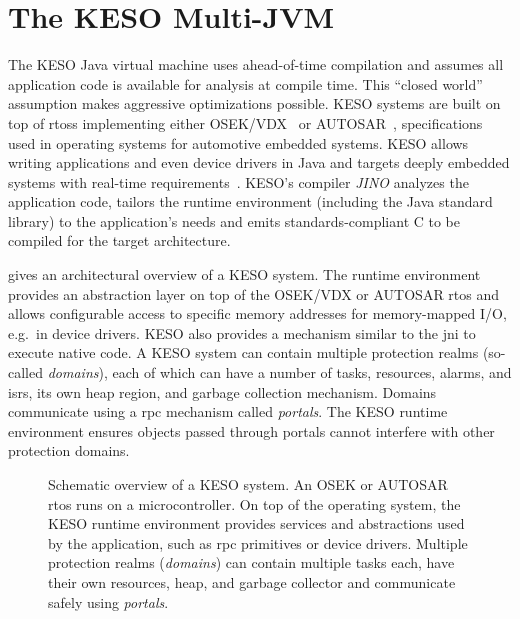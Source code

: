 	\section{The KESO Multi-JVM}
		\label{sec:intro:keso}
		The KESO Java virtual machine uses ahead-of-time compilation and assumes all application code is available for
		analysis at compile time. This \enquote{closed world} assumption makes aggressive optimizations possible. KESO
		systems are built on top of \glspl{rtos} implementing either OSEK/VDX~\cite{OSEKSpec223} or
		AUTOSAR~\cite{autosar:06:sws_os}, specifications used in operating systems for automotive embedded systems. KESO
		allows writing applications and even device drivers in Java and targets deeply embedded systems with real-time
		requirements~\cite{thomm:10:jtres}. KESO's compiler \emph{JINO} analyzes the application code, tailors the runtime
		environment (including the Java standard library) to the application's needs and emits standards-compliant C to be
		compiled for the target architecture.

		 gives an architectural overview of a KESO system. The runtime environment provides an
		abstraction layer on top of the OSEK/VDX or AUTOSAR \gls{rtos} and allows configurable access to specific memory
		addresses for memory-mapped I/O, e.g.\ in device drivers. KESO also provides a mechanism similar to the \gls{jni} to
		execute native code. A KESO system can contain multiple protection realms (so-called \emph{domains}), each of which
		can have a number of tasks, resources, alarms, and \glspl{isr}, its own heap region, and garbage collection
		mechanism. Domains communicate using a \gls{rpc} mechanism called \emph{portals}. The KESO runtime environment
		ensures objects passed through portals cannot interfere with other protection domains.

		\begin{figure}
			\begin{center}
				
			\end{center}
			\caption[Schematic overview of a KESO system]{%
				Schematic overview of a KESO system. An OSEK or AUTOSAR \gls{rtos} runs on a microcontroller. On top of the
				operating system, the KESO runtime environment provides services and abstractions used by the application, such
				as \gls{rpc} primitives or device drivers. Multiple protection realms (\emph{domains}) can contain multiple
				tasks each, have their own resources, heap, and garbage collector and communicate safely using \emph{portals}.}
			\label{fig:intro:overview}
		\end{figure}

